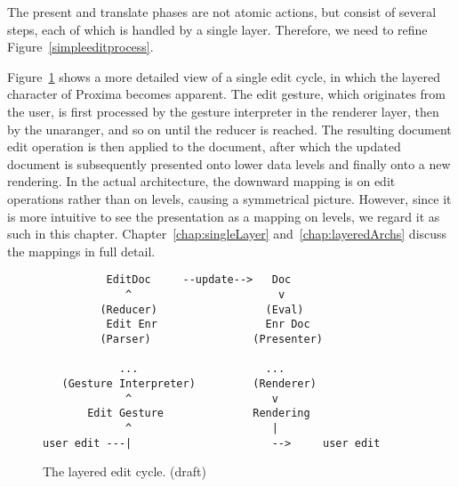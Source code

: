 The present and translate phases are not atomic actions, but consist of several steps, each of which is handled by a single layer. Therefore, we need to refine Figure~\ref{simpleeditprocess}. 

Figure~\ref{simplelayers} shows a more detailed view of a single edit cycle, in which the layered character of Proxima becomes apparent. The edit gesture, which originates from the user, is first processed by the gesture interpreter in the renderer layer, then by the unaranger, and so on until the reducer is reached. The resulting document edit operation is then applied to the document, after which the updated document is subsequently presented onto lower data levels and finally onto a new rendering. In the actual architecture, the downward mapping is on edit operations rather than on levels, causing a symmetrical picture. However, since it is more intuitive to see the presentation as a mapping on levels, we regard it as such in this chapter. Chapter~\ref{chap:singleLayer} and~\ref{chap:layeredArchs} discuss the mappings in full detail.

\begin{figure}
\begin{small}
\begin{center}
\begin{center}
\begin{scriptsize}
\begin{verbatim}
          EditDoc     --update-->   Doc       																																	  
             ^                       v
         (Reducer)                 (Eval)     																																	  
          Edit Enr                 Enr Doc    																																	  
         (Parser)                (Presenter)  																																	  
                                           																																	  
            ...                    ...       																																	  
   (Gesture Interpreter)         (Renderer)   																																	  
             ^                      v
       Edit Gesture              Rendering    																																	  
             ^                      |         																																	  
user edit ---|                      -->     user edit
\end{verbatim}
\end{scriptsize}
\end{center}\caption{The layered edit cycle. (draft)} \label{simplelayers} 
\end{center}
\end{small}
\end{figure}



